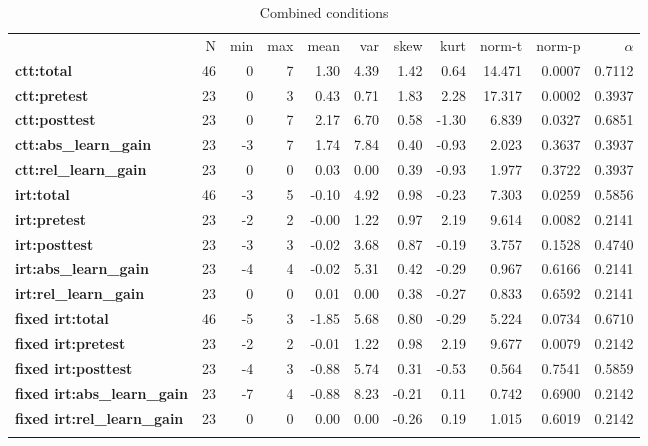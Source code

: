 \begin{longtable}[c]{@{}lrrrrrrrrrr@{}}
\caption{Combined conditions}
\endfirsthead
\endhead
\toprule\addlinespace
& N & min & max & mean & var & skew & kurt & norm-t &
norm-p & $\alpha$
\\\addlinespace
\midrule
\textbf{ctt:total} & 46 & 0 & 7 & 1.30 & 4.39 & 1.42 & 0.64 & 14.471 &
0.0007 & 0.7112
\\\addlinespace
\textbf{ctt:pretest} & 23 & 0 & 3 & 0.43 & 0.71 & 1.83 & 2.28 & 17.317 &
0.0002 & 0.3937
\\\addlinespace
\textbf{ctt:posttest} & 23 & 0 & 7 & 2.17 & 6.70 & 0.58 & -1.30 & 6.839
& 0.0327 & 0.6851
\\\addlinespace
\textbf{ctt:abs\_learn\_gain} & 23 & -3 & 7 & 1.74 & 7.84 & 0.40 & -0.93
& 2.023 & 0.3637 & 0.3937
\\\addlinespace
\textbf{ctt:rel\_learn\_gain} & 23 & 0 & 0 & 0.03 & 0.00 & 0.39 & -0.93
& 1.977 & 0.3722 & 0.3937
\\\addlinespace
\textbf{irt:total} & 46 & -3 & 5 & -0.10 & 4.92 & 0.98 & -0.23 & 7.303 &
0.0259 & 0.5856
\\\addlinespace
\textbf{irt:pretest} & 23 & -2 & 2 & -0.00 & 1.22 & 0.97 & 2.19 & 9.614
& 0.0082 & 0.2141
\\\addlinespace
\textbf{irt:posttest} & 23 & -3 & 3 & -0.02 & 3.68 & 0.87 & -0.19 &
3.757 & 0.1528 & 0.4740
\\\addlinespace
\textbf{irt:abs\_learn\_gain} & 23 & -4 & 4 & -0.02 & 5.31 & 0.42 &
-0.29 & 0.967 & 0.6166 & 0.2141
\\\addlinespace
\textbf{irt:rel\_learn\_gain} & 23 & 0 & 0 & 0.01 & 0.00 & 0.38 & -0.27
& 0.833 & 0.6592 & 0.2141
\\\addlinespace
\textbf{fixed irt:total} & 46 & -5 & 3 & -1.85 & 5.68 & 0.80 & -0.29
& 5.224 & 0.0734 & 0.6710
\\\addlinespace
\textbf{fixed irt:pretest} & 23 & -2 & 2 & -0.01 & 1.22 & 0.98 & 2.19
& 9.677 & 0.0079 & 0.2142
\\\addlinespace
\textbf{fixed irt:posttest} & 23 & -4 & 3 & -0.88 & 5.74 & 0.31 &
-0.53 & 0.564 & 0.7541 & 0.5859
\\\addlinespace
\textbf{fixed irt:abs\_learn\_gain} & 23 & -7 & 4 & -0.88 & 8.23 &
-0.21 & 0.11 & 0.742 & 0.6900 & 0.2142
\\\addlinespace
\textbf{fixed irt:rel\_learn\_gain} & 23 & 0 & 0 & 0.00 & 0.00 &
-0.26 & 0.19 & 1.015 & 0.6019 & 0.2142
\\\addlinespace
\bottomrule
    \label{tab:know_gen}
\end{longtable}

